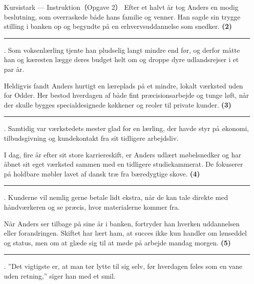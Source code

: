 \begin{emailbox}{Kursistark --- Instruktion（Opgave 2）}
\vspace{0.25em}
Efter et halvt år tog Anders en modig beslutning, som overraskede både hans familie og venner. Han sagde sin trygge stilling i banken op og begyndte på en erhvervsuddannelse som snedker. \textbf{(2)}\ \rule{1.8cm}{0.4pt}. Som voksenlærling tjente han pludselig langt mindre end før, og derfor måtte han og kæresten lægge deres budget helt om og droppe dyre udlandsrejser i et par år.

\vspace{0.25em}
Heldigvis fandt Anders hurtigt en læreplads på et mindre, lokalt værksted uden for Odder. Her bestod hverdagen af både fint præcisionsarbejde og tunge løft, når der skulle bygges specialdesignede køkkener og reoler til private kunder. \textbf{(3)}\ \rule{1.8cm}{0.4pt}. Samtidig var værkstedets mester glad for en lærling, der havde styr på økonomi, tilbudsgivning og kundekontakt fra sit tidligere arbejdsliv.

\vspace{0.25em}
I dag, fire år efter sit store karriereskift, er Anders udlært møbelsnedker og har åbnet sit eget værksted sammen med en tidligere studiekammerat. De fokuserer på holdbare møbler lavet af dansk træ fra bæredygtige skove. \textbf{(4)}\ \rule{1.8cm}{0.4pt}. Kunderne vil nemlig gerne betale lidt ekstra, når de kan tale direkte med håndværkeren og se præcis, hvor materialerne kommer fra.

\vspace{0.25em}
Når Anders ser tilbage på sine år i banken, fortryder han hverken uddannelsen eller forandringen. Skiftet har lært ham, at succes ikke kun handler om lønseddel og status, men om at glæde sig til at møde på arbejde mandag morgen. \textbf{(5)}\ \rule{1.8cm}{0.4pt}. ”Det vigtigste er, at man tør lytte til sig selv, før hverdagen føles som en vane uden retning,” siger han med et smil.
\end{emailbox}

